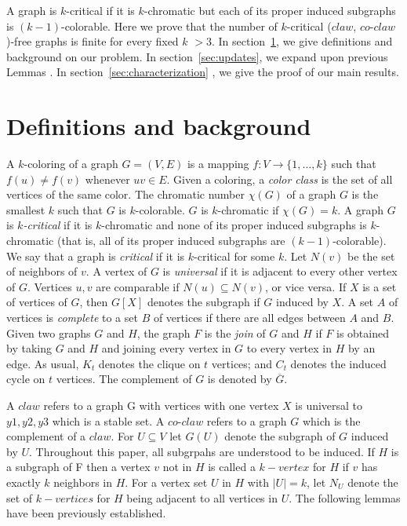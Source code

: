 \documentclass[12pt]{article}
\def\CCO{($claw$, $co$-$claw$)}
\begin{document}
A graph is $k$-critical if it is $k$-chromatic but each of its proper induced subgraphs is $(k-1)$-colorable. Here we prove that the number of $k$-critical {\CCO}-free graphs is finite for every fixed $k$ $ > 3$.
In section~\ref{sec:definitions}, we give definitions and background on our problem. In section~\ref{sec:updates}, we expand upon previous Lemmas \cite{BraFud2002}. In section~\ref{sec:characterization} , we give the proof of our main results. 

\section{Definitions and background}\label{sec:definitions} 
A $k$-coloring of a graph $G=(V,E)$ is a mapping $f: V \rightarrow \{1,\ldots, k\}$ such that $f(u) \not= f(v)$ whenever $uv \in E$. Given a coloring, a {\it color class} is the set of all vertices of the same color.  The chromatic number $\chi(G)$ of a graph $G$ is the smallest $k$ such that $G$ is $k$-colorable.  $G$ is $k$-chromatic if $\chi(G) = k$.  A graph $G$ is {\em $k$-critical} if it is $k$-chromatic and none of its proper induced subgraphs is $k$-chromatic (that is, all of its proper induced subgraphs are $(k-1)$-colorable).  We say that a graph is {\it critical} if it is $k$-critical for some $k$.  Let $N(v)$ be the set of neighbors of $v$. A vertex of $G$ is {\it universal} if it is adjacent to every other vertex of $G$. Vertices $u,v$ are comparable if $N(u) \subseteq N(v)$, or vice versa. If $X$ is a set of vertices of $G$, then $G[X]$ denotes the subgraph if $G$ induced by $X$.  A set $A$ of vertices is {\it complete} to a set $B$ of vertices if there are all edges between $A$ and $B$.  Given two graphs $G$ and $ H$, the graph $F$ is the {\it join} of $G$ and $H$ if $F$ is obtained by taking $G$ and $H$ and joining every vertex in $G$ to every vertex in $H$ by an edge.  As usual, $K_t$ denotes the clique on $t$ vertices; and $C_t$ denotes the induced cycle on $t$ vertices. The complement of $G$ is denoted by $\overline{G}$. 

A $claw$ refers to a graph G with vertices with one vertex $X$ is universal to {$y1,y2,y3$} which is a stable set. A $co$-$claw$ refers to a graph $G$ which is the complement of a $claw$. For $U \subseteq V$ let $G(U)$ denote the subgraph of $G$ induced by $U$. Throughout this paper, all subgrpahs are understood to be induced. If $H$ is a subgraph of F then a vertex $v$ not in $H$ is called a $k-vertex$ for $H$ if $v$ has exactly $k$ neighbors in $H$. For a vertex set $U$ in $H$ with $|U| = k$, let $N_U$ denote the set of $k-vertices$ for $H$ being adjacent to all vertices in $U$.  The following lemmas have been previously established.
\end{document}
